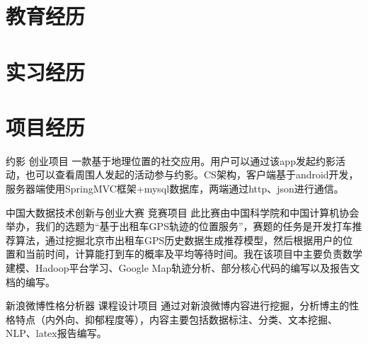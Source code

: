 \documentclass[11pt,a4paper]{moderncv}
\title{}               %
\begin{document}
\maketitle

\section{教育经历}

\section{实习经历}

\section{项目经历}
\renewcommand{\baselinestretch}{1.2}


\vspace*{0.2\baselineskip}
{约影}
{}
{创业项目}{}
{一款基于地理位置的社交应用。用户可以通过该app发起约影活动，也可以查看周围人发起的活动参与约影。CS架构，客户端基于android开发，服务器端使用SpringMVC框架+mysql数据库，两端通过http、json进行通信。}

\vspace*{0.2\baselineskip}
{中国大数据技术创新与创业大赛}
{}
{竞赛项目}{}
{此比赛由中国科学院和中国计算机协会举办，我们的选题为“基于出租车GPS轨迹的位置服务”，赛题的任务是开发打车推荐算法，通过挖掘北京市出租车GPS历史数据生成推荐模型，然后根据用户的位置和当前时间，计算能打到车的概率及平均等待时间。我在该项目中主要负责数学建模、Hadoop平台学习、Google Map轨迹分析、部分核心代码的编写以及报告文档的编写。}


\vspace*{0.2\baselineskip}
{新浪微博性格分析器}
{}
{课程设计项目}{}
{通过对新浪微博内容进行挖掘，分析博主的性格特点（内外向、抑郁程度等），内容主要包括数据标注、分类、文本挖掘、NLP、latex报告编写。}
\end{document}
